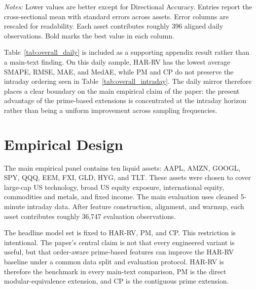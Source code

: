 \documentclass[a4paper]{article}
\begin{document}
{\renewcommand{\thetable}{1B}
\begin{center}
\label{tab:overall_daily}
\small
\renewcommand{\arraystretch}{1.15}
\setlength{\tabcolsep}{6pt}
\resizebox{0.98\textwidth}{!}{}

\vspace{0.1cm}
\footnotesize \parbox{0.92\textwidth}{\textit{Notes:} Lower values are better except for Directional Accuracy. Entries report the cross-sectional mean with standard errors across assets. Error columns are rescaled for readability. Each asset contributes roughly 396 aligned daily observations. Bold marks the best value in each column.}
\end{center}}

\noindent
Table~\ref{tab:overall_daily} is included as a supporting appendix result rather than a main-text finding. On this daily sample, HAR-RV has the lowest average SMAPE, RMSE, MAE, and MedAE, while PM and CP do not preserve the intraday ordering seen in Table~\ref{tab:overall_intraday}. The daily mirror therefore places a clear boundary on the main empirical claim of the paper: the present advantage of the prime-based extensions is concentrated at the intraday horizon rather than being a uniform improvement across sampling frequencies.

\section{Empirical Design}

\noindent
The main empirical panel contains ten liquid assets: AAPL, AMZN, GOOGL, SPY, QQQ, EEM, FXI, GLD, HYG, and TLT. These assets were chosen to cover large-cap US technology, broad US equity exposure, international equity, commodities and metals, and fixed income. The main evaluation uses cleaned 5-minute intraday data. After feature construction, alignment, and warmup, each asset contributes roughly 36,747 evaluation observations.

\noindent
The headline model set is fixed to HAR-RV, PM, and CP. This restriction is intentional. The paper's central claim is not that every engineered variant is useful, but that order-aware prime-based features can improve the HAR-RV baseline under a common data split and evaluation protocol. HAR-RV is therefore the benchmark in every main-text comparison, PM is the direct modular-equivalence extension, and CP is the contiguous prime extension.
\end{document}
